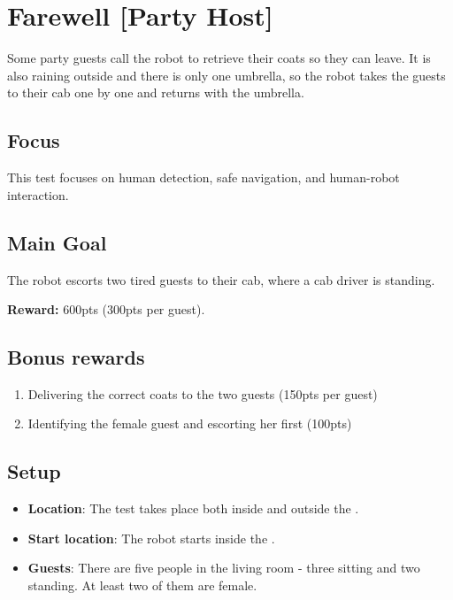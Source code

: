 \section{Farewell [Party Host]}
\label{test:farewell}
Some party guests call the robot to retrieve their coats so they can leave.
It is also raining outside and there is only one umbrella, so the robot takes the guests to their cab one by one and returns with the umbrella.

\subsection*{Focus}
This test focuses on human detection, safe navigation, and human-robot interaction.

\subsection*{Main Goal}
The robot escorts two tired guests to their cab, where a cab driver is standing.

\noindent\textbf{Reward:} 600pts (300pts per guest).

\subsection*{Bonus rewards}
\begin{enumerate}[nosep]
	\item Delivering the correct coats to the two guests (150pts per guest)
	\item Identifying the female guest and escorting her first (100pts)
\end{enumerate}


\subsection*{Setup}
\begin{itemize}
	\item \textbf{Location}: The test takes place both inside and outside the \Arena{}.
	\item \textbf{Start location}: The robot starts inside the \Arena{}.
	\item \textbf{Guests}: There are five people in the living room - three sitting and two standing. At least two of them are female.
\end{itemize}

